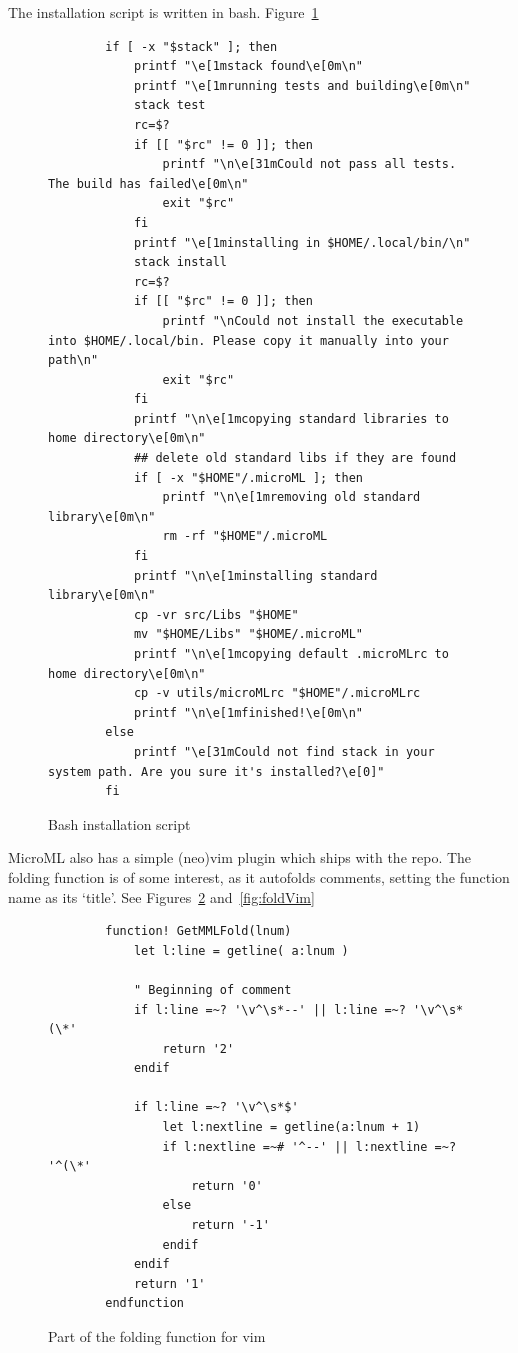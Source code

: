The installation script is written in bash. Figure~\ref{fig:installation}
\begin{figure}
    \begin{verbatim}
        if [ -x "$stack" ]; then
            printf "\e[1mstack found\e[0m\n"
            printf "\e[1mrunning tests and building\e[0m\n"
            stack test 
            rc=$?
            if [[ "$rc" != 0 ]]; then
                printf "\n\e[31mCould not pass all tests. The build has failed\e[0m\n"
                exit "$rc" 
            fi
            printf "\e[1minstalling in $HOME/.local/bin/\n"
            stack install
            rc=$?
            if [[ "$rc" != 0 ]]; then
                printf "\nCould not install the executable into $HOME/.local/bin. Please copy it manually into your path\n"
                exit "$rc"
            fi
            printf "\n\e[1mcopying standard libraries to home directory\e[0m\n"
            ## delete old standard libs if they are found
            if [ -x "$HOME"/.microML ]; then
                printf "\n\e[1mremoving old standard library\e[0m\n"
                rm -rf "$HOME"/.microML
            fi
            printf "\n\e[1minstalling standard library\e[0m\n"
            cp -vr src/Libs "$HOME"
            mv "$HOME/Libs" "$HOME/.microML"
            printf "\n\e[1mcopying default .microMLrc to home directory\e[0m\n"
            cp -v utils/microMLrc "$HOME"/.microMLrc
            printf "\n\e[1mfinished!\e[0m\n"
        else 
            printf "\e[31mCould not find stack in your system path. Are you sure it's installed?\e[0]"
        fi
    \end{verbatim}
    \caption{Bash installation script}
\label{fig:installation}
\end{figure}

MicroML also has a simple (neo)vim plugin which ships with the repo. The folding function is of some
interest, as it autofolds comments, setting the function name as its `title'. See
Figures~\ref{fig:fold} and~\ref{fig:foldVim}

\begin{figure}
    \begin{verbatim}
        function! GetMMLFold(lnum) 
            let l:line = getline( a:lnum )

            " Beginning of comment
            if l:line =~? '\v^\s*--' || l:line =~? '\v^\s*(\*'
                return '2'
            endif

            if l:line =~? '\v^\s*$'
                let l:nextline = getline(a:lnum + 1)
                if l:nextline =~# '^--' || l:nextline =~? '^(\*'
                    return '0'
                else
                    return '-1'
                endif
            endif
            return '1'
        endfunction 
    \end{verbatim}
    \caption{Part of the folding function for vim}
\label{fig:fold}
\end{figure}

